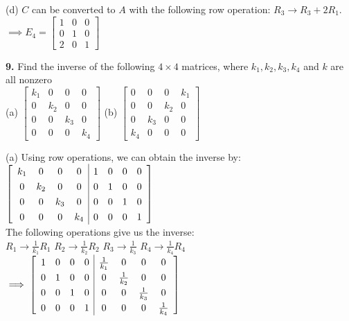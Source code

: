 \documentclass[addpoints]{exam}
\begin{document}
\begin{questions}
\begin{solution}
        (d) $C$ can be converted to $A$ with the following row operation: $ R_3 \longrightarrow R_3 + 2 R_1 $. \\ 
        $ \implies E_4 = \begin{bmatrix}
            1 & 0 & 0 \\ 0 & 1 & 0 \\ 2 & 0 & 1
        \end{bmatrix} $
    \end{solution}

    \textbf{9. } Find the inverse of the following $ 4 \times 4 $ matrices, where $ k_1, k_2, k_3, k_4 $ and $k$ are all nonzero \\ 
    (a) $ \begin{bmatrix}
        k_1 & 0 & 0 & 0 \\ 0 & k_2 & 0 & 0 \\ 0 & 0 & k_3 & 0 \\ 0 & 0 & 0 & k_4
    \end{bmatrix} $ \hspace{5mm} (b) $ \begin{bmatrix}
        0 & 0 & 0 & k_1 \\ 0 & 0 & k_2 & 0 \\ 0 & k_3 & 0 & 0 \\ k_4 & 0 & 0 & 0
    \end{bmatrix} $
    \begin{solution}
        
        (a) Using row operations, we can obtain the inverse by: \\
        $ \renewcommand\arraystretch{1.3}
    \mleft[ 
    \begin{array}{cccc|cccc}
        k_1 & 0 & 0 & 0 & 1 & 0 & 0 & 0 \\ 
        0 & k_2 & 0 & 0 & 0 & 1 & 0 & 0 \\ 
        0 & 0 & k_3 & 0 & 0 & 0 & 1 & 0 \\ 
        0 & 0 & 0 & k_4 & 0 & 0 & 0 & 1
    \end{array}
    \mright] $ \\ 
    The following operations give us the inverse: \\ 
    $ R_1 \rightarrow \frac{1}{k_1}R_1 $ \hspace{5mm} $ R_2 \rightarrow \frac{1}{k_2}R_2 $ \hspace{5mm} $ R_3 \rightarrow \frac{1}{k_3} $ \hspace{5mm} $ R_4 \rightarrow \frac{1}{k_4}R_4 $ \\ 
    $ \implies 
    \renewcommand\arraystretch{1.3}
    \mleft[ 
    \begin{array}{cccc|cccc}
        1 & 0 & 0 & 0 & \frac{1}{k_1} & 0 & 0 & 0 \\ 
        0 & 1 & 0 & 0 & 0 & \frac{1}{k_2} & 0 & 0 \\
        0 & 0 & 1 & 0 & 0 & 0 & \frac{1}{k_3} & 0 \\ 
        0 & 0 & 0 & 1 & 0 & 0 & 0 & \frac{1}{k_4}
    \end{array}
    \mright]
    $


\end{solution}
\end{questions}
\end{document}
